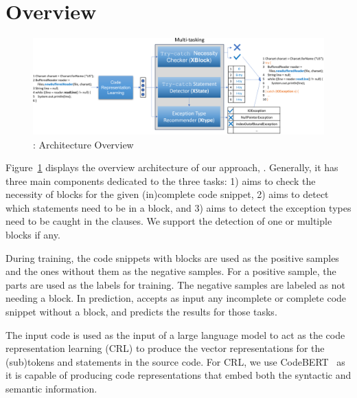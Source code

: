 \section{{\tool} Overview}
\label{sec:overview}

\begin{figure}[t]
\begin{center}
\includegraphics[width=5.6in]{overview-3.png}
\vspace{-10pt}
\caption{{\tool}: Architecture Overview}
\label{overview}
\end{center}
\end{figure}

Figure~\ref{overview} displays the overview architecture of our
approach, {\tool}. Generally, it has three main components dedicated
to the three tasks: 1) {\xblock} aims to check the necessity of
 blocks for the given (in)complete code snippet,
2){\xstate} aims to detect which statements need to be in a
 block, and 3) {\xtype} aims to detect the exception
types need to be caught in the  clauses. We support the
detection of one or multiple  blocks if any.
     
During training, the code snippets with  blocks are
used as the positive samples and the ones without them as the negative
samples. For a positive sample, the  parts are used as
the labels for training. The negative samples are labeled as not
needing a  block. In prediction, {\tool} accepts as
input any incomplete or complete code snippet without a
 block, and predicts the results for those tasks.

The input code is used as the input of a large language model to act
as the code representation learning (CRL) to produce the vector
representations for the (sub)tokens and statements in the source
code. For CRL, we use CodeBERT~\cite{codebert-emnlp20} as it is
capable of producing code representations that embed both the
syntactic and semantic information. 

